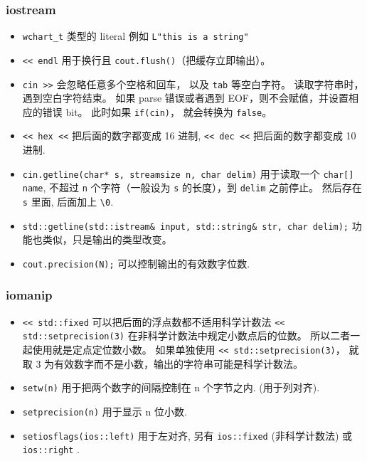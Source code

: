 \subsubsection{iostream}
\begin{itemize}
\item \verb`wchart_t` 类型的 literal 例如 \verb`L"this is a string"`
\item \verb`<< endl` 用于换行且 \verb|cout.flush()|（把缓存立即输出）。
\item \verb|cin >>| 会忽略任意多个空格和回车， 以及 \verb|tab| 等空白字符。 读取字符串时，遇到空白字符结束。 如果 parse 错误或者遇到 EOF，则不会赋值，并设置相应的错误 bit。 此时如果 \verb|if(cin)|， 就会转换为 \verb|false|。
\item \verb`<< hex <<` 把后面的数字都变成 16 进制, \verb`<< dec <<` 把后面的数字都变成 10 进制.
\item \verb`cin.getline(char* s, streamsize n, char delim)` 用于读取一个 \verb`char[] name`, 不超过 \verb|n| 个字符（一般设为 \verb|s| 的长度），到 \verb|delim| 之前停止。 然后存在 \verb|s| 里面, 后面加上 \verb`\0`.
\item \verb|std::getline(std::istream& input, std::string& str, char delim);| 功能也类似，只是输出的类型改变。
\item \verb`cout.precision(N);` 可以控制输出的有效数字位数.
\end{itemize}

\subsubsection{iomanip}
\begin{itemize}
\item \verb|<< std::fixed| 可以把后面的浮点数都不适用科学计数法 \verb|<< std::setprecision(3)| 在非科学计数法中规定小数点后的位数。 所以二者一起使用就是定点定位数小数。 如果单独使用 \verb|<< std::setprecision(3)|， 就取 3 为有效数字而不是小数，输出的字符串可能是科学计数法。
\item \verb`setw(n)` 用于把两个数字的间隔控制在 n 个字节之内. (用于列对齐).
\item \verb`setprecision(n)` 用于显示 n 位小数.
\item \verb`setiosflags(ios::left)` 用于左对齐, 另有 \verb`ios::fixed` (非科学计数法) 或 \verb`ios::right` .
\end{itemize}

